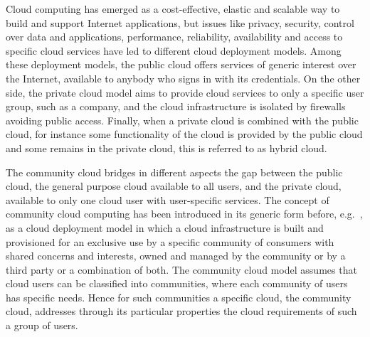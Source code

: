 
Cloud computing has emerged as a cost-effective, elastic and scalable way to build and support Internet applications, 
but issues like privacy, security, control over data and applications, performance, reliability, availability and access to specific cloud services have led to different cloud deployment models.
Among these deployment models, the public cloud offers services of generic interest over the Internet, available to anybody who signs in with its credentials. 
On the other side, the private cloud model aims to provide cloud services to only a specific user group, 
such as a company, and the cloud infrastructure is isolated by firewalls avoiding public access. 
Finally, when a private cloud is combined with the public cloud, for instance some functionality of the cloud is provided by the public cloud and some remains in the private cloud, this is referred to as hybrid cloud.

The community cloud bridges in different aspects the gap between the public cloud, the general purpose cloud available to all users, %
and the private cloud, available to only one cloud user with user-specific services. 
The concept of community cloud computing has been introduced in its generic form before, e.g.~\cite{Mell2011}, as a cloud deployment model in which a cloud infrastructure is built and provisioned for an exclusive use by a specific community of consumers with shared concerns and interests, owned and managed by the community or by a third party or a combination of both.
The community cloud model assumes that cloud users can be classified into communities, where each community of users has specific needs. 
Hence for such communities a specific cloud, the community cloud, addresses through its particular properties the cloud requirements of such a group of users.


